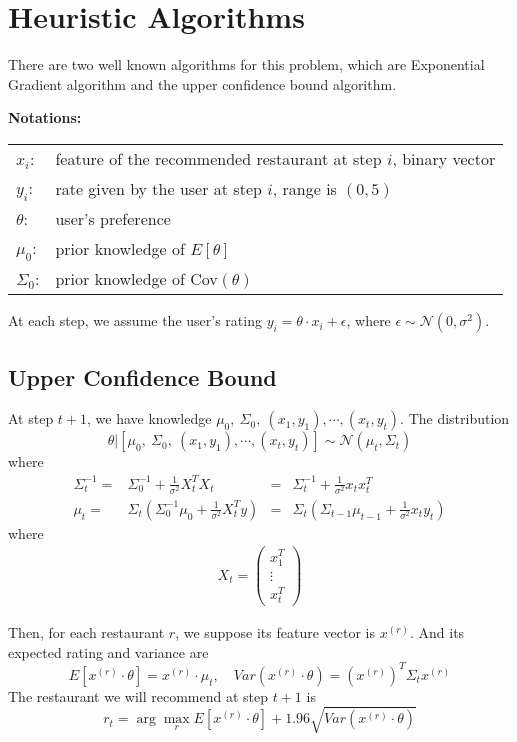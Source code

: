 \documentclass{article}
\begin{document}
\section{Heuristic Algorithms}
There are two well known algorithms for this problem, which are Exponential Gradient algorithm and the upper confidence bound algorithm.\

\textbf{Notations: }

\begin{center}
\begin{tabular}{ll}
${x}_i$: & feature of the recommended restaurant at step $i$, binary vector\\
$y_i$: & rate given by the user at step $i$, range is $(0,5)$\\
${\theta}$: & user's preference\\
${\mu_0}$: & prior knowledge of ${E}[{\theta}]$ \\
$\Sigma_0$: & prior knowledge of Cov$(\theta)$
\end{tabular}
\end{center}

At each step, we assume the user's rating $y_i = \theta\cdot {x}_i+\epsilon$, where $\epsilon\sim\mathcal{N}(0,\sigma^2)$.

\subsection{Upper Confidence Bound}
At step $t+1$, we have knowledge $\mu_0,\ \Sigma_0,\ ({x}_1, y_1), \cdots, ({x}_{t}, y_t)$. The distribution 
\[\theta | [ \mu_0,\ \Sigma_0,\ ({x}_1, y_1), \cdots, ({x}_{t}, y_t) ] \sim \mathcal{N}(\mu_{t}, \Sigma_{t}) \]
where 
\begin{align}
\Sigma_{t}^{-1} = & \Sigma_0^{-1}+\frac{1}{\sigma^2}X_t^TX_t &=& \Sigma_t^{-1} + \frac{1}{\sigma^2}{x}_t{x}_t^T\\
\mu_t = & \Sigma_t\left( \Sigma_0^{-1}\mu_0 + \frac{1}{\sigma^2}X_t^Ty \right) &= &\Sigma_t\left(\Sigma_{t-1}\mu_{t-1}+\frac{1}{\sigma^2}{x}_t y_t\right)
\end{align}
where 
\begin{align*}
X_t = \left(
\begin{array}{c}
{x}_1^T\\
\vdots\\
{x}_t^T
\end{array}\right)
\end{align*}

Then, for each restaurant $r$, we suppose its feature vector is ${x}^{(r)}$. And its expected rating and variance are
\[E[{x}^{(r)}\cdot \theta] = {x}^{(r)}\cdot \mu_t,\quad Var({x}^{(r)}\cdot \theta) =({x}^{(r)})^T\Sigma_t {x}^{(r)} \]
The restaurant we will recommend at step $t+1$ is
\[r_t = \arg\max_r E[{x}^{(r)}\cdot \theta] + 1.96 \sqrt{Var({x}^{(r)}\cdot \theta)}\]
\end{document}
